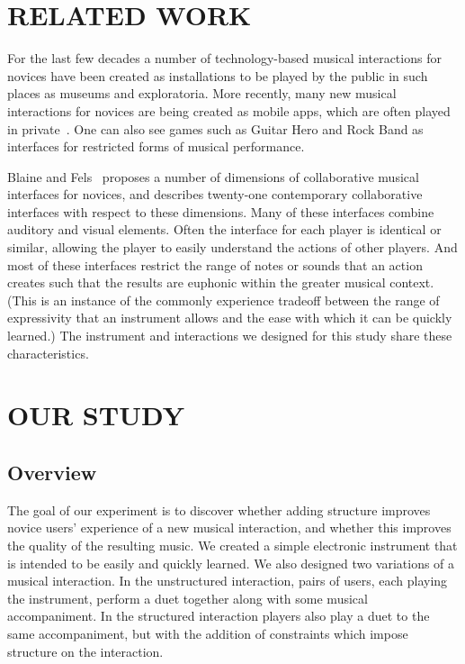 \documentclass{article}
\begin{document}
\section{RELATED WORK}

For the last few decades a number of technology-based musical interactions for novices have
been created as installations to be played by the public in such places as museums and exploratoria.  More recently, many new musical interactions for novices are being created as mobile apps, which are often played in private~\cite{smule,smule-2}.  One can also see games such as Guitar Hero and Rock Band as interfaces for restricted forms of musical performance.

Blaine and Fels~\cite{survey} proposes a number of dimensions of collaborative musical interfaces for novices, and describes twenty-one contemporary collaborative interfaces with respect to these dimensions.  Many of these interfaces combine auditory and visual elements.  Often the interface for each player is identical or similar, allowing the player to easily understand the actions of other players. And most of these interfaces restrict the range of notes or sounds that an action creates such that the results are euphonic within the greater musical context.  (This is an instance of the commonly experience tradeoff between the range of expressivity that an instrument allows and the ease with which it can be quickly learned.)  The instrument and interactions we designed for this study share these characteristics.





\section{OUR STUDY}

\subsection{Overview}

The goal of our experiment is to discover whether adding structure improves novice users' experience of a new musical interaction, and whether this improves the quality of the resulting music.  We created a simple electronic instrument that is intended to be easily and quickly learned.  We also designed two variations of a musical interaction.  In the unstructured interaction, pairs of users, each playing the instrument, perform a duet together along with some musical accompaniment.  In the structured interaction players also play a duet to the same accompaniment, but with the addition of constraints which impose structure on the interaction.
\end{document}
